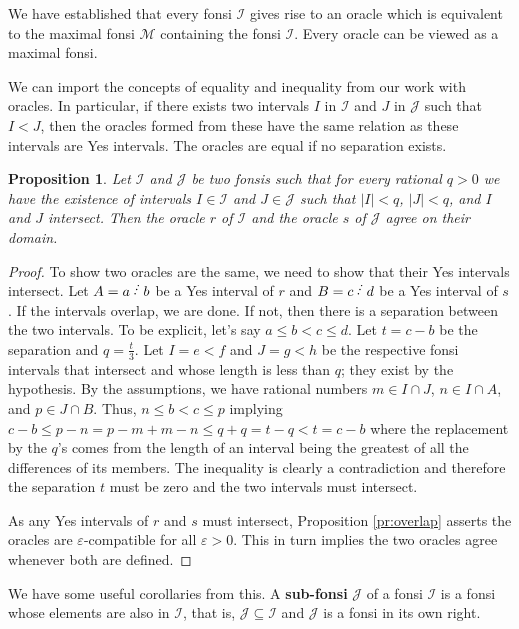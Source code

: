 \documentclass[12pt]{article}
\newtheorem{proposition}{Proposition}[subsection]
\begin{document}
We have established that every fonsi $\mathcal{I}$ gives rise to an oracle which is equivalent to the maximal fonsi $\mathcal{M}$ containing the fonsi $\mathcal{I}$. Every oracle can be viewed as a maximal fonsi.

We can import the concepts of equality and inequality from our work with oracles. In particular, if there exists two intervals $I$ in $\mathcal{I}$ and $J$ in $\mathcal{J}$ such that $I < J$, then the oracles formed from these have the same relation as these intervals are Yes intervals. The oracles are equal if no separation exists. 

\begin{proposition}\label{pr:fonsi-inter}
Let $\mathcal{I}$ and $\mathcal{J}$ be two fonsis such that for every rational $q>0$ we have the existence of intervals $I \in \mathcal{I}$ and $J \in \mathcal{J}$ such that $|I| <q$, $|J| < q$, and $I$ and $J$ intersect. Then the oracle $r$ of $\mathcal{I}$ and the oracle $s$ of $\mathcal{J}$ agree on their domain. 
\end{proposition}

\begin{proof}
To show two oracles are the same, we need to show that their Yes intervals intersect. Let $A=a\lte b$ be a Yes interval of $r$ and $B=c \lte d$ be a Yes interval of $s$. If the intervals overlap, we are done. If not, then there is a separation between the two intervals. To be explicit, let's say $a \leq b < c \leq d$. Let $t = c-b$ be the separation and $q = \frac{t}{3}$. Let $I= e\lt f$ and $J= g \lt h$ be the respective fonsi intervals that intersect and whose length is less than $q$;  they exist by the hypothesis. By the assumptions, we have rational numbers $m \in I \cap J$, $n \in I \cap A$, and $p \in J \cap B$. Thus,  $n \leq b < c \leq p$ implying $c-b \leq p - n  = p-m + m-n \leq q + q = t - q < t = c-b$ where the replacement by the $q$'s comes from the length of an interval being the greatest of all the differences of its members. The inequality is clearly a contradiction and therefore the separation $t$ must be zero and the two intervals must intersect. 
 
As any Yes intervals of $r$ and $s$ must intersect, Proposition \ref{pr:overlap} asserts the oracles are $\varepsilon$-compatible for all $\varepsilon >0$. This in turn implies the two oracles agree whenever both are defined. 
\end{proof}

We have some useful corollaries from this. A \textbf{sub-fonsi} $\mathcal{J}$ of a fonsi $\mathcal{I}$ is a fonsi whose elements are also in $\mathcal{I}$, that is, $\mathcal{J} \subseteq \mathcal{I}$ and $\mathcal{J}$ is a fonsi in its own right.  
\end{document}
